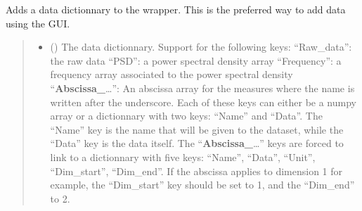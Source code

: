 \documentclass[letterpaper,10pt,english]{sphinxmanual}
\begin{document}
\begin{fulllineitems}
\begin{fulllineitems}
\begin{sphinxVerbatim}[commandchars=\\\{\}]
          
\end{sphinxVerbatim}

\end{fulllineitems}


\begin{fulllineitems}
\label{\detokenize{_autosummary/HDF5_BLS.wrapper:HDF5_BLS.wrapper.Wrapper.add_dictionnary}}
\pysigstartsignatures
\pysiglinewithargsret
{}
{\sphinxparamcomma {}\sphinxparamcomma {}\sphinxparamcomma {}\sphinxparamcomma {}}
{}
\pysigstopsignatures
\sphinxAtStartPar
Adds a data dictionnary to the wrapper. This is the preferred way to add data using the GUI.
\begin{quote}\begin{description}
\begin{itemize}
\item {} 
\sphinxAtStartPar
{} () \textendash{} The data dictionnary. Support for the following keys:
\sphinxhyphen{} “Raw\_data”: the raw data
\sphinxhyphen{} “PSD”: a power spectral density array
\sphinxhyphen{} “Frequency”: a frequency array associated to the power spectral density
\sphinxhyphen{} “{\color{red}\bfseries{}Abscissa\_}…”: An abscissa array for the measures where the name is written after the underscore.
Each of these keys can either be a numpy array or a dictionnary with two keys: “Name” and “Data”. The “Name” key is the name that will be given to the dataset, while the “Data” key is the data itself.
The “{\color{red}\bfseries{}Abscissa\_}…” keys are forced to link to a dictionnary with five keys: “Name”, “Data”, “Unit”, “Dim\_start”, “Dim\_end”. If the abscissa applies to dimension 1 for example, the “Dim\_start” key should be set to 1, and the “Dim\_end” to 2.


\end{itemize}
\end{description}
\end{quote}
\end{fulllineitems}
\end{fulllineitems}
\end{document}
